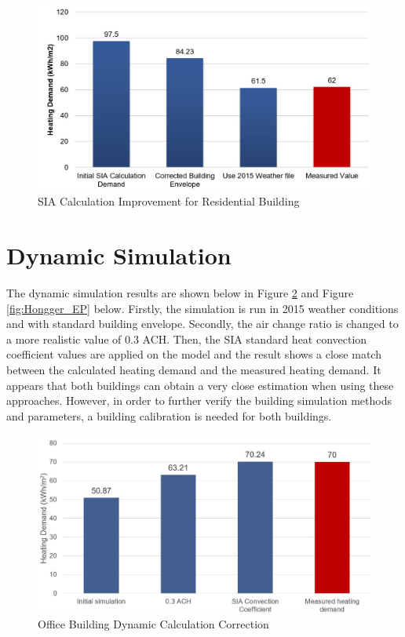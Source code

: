 \documentclass[a4paper, oneside]{discothesis}
\begin{document}
		\begin{figure}[htbp]
		\centering
		\includegraphics[scale=0.4]{Residential_SIA.jpg}
		\caption{SIA Calculation Improvement for Residential Building}
		\label{fig:Hongger_SIA}
		\end{figure}
		
		
	\newpage		  
	\section{Dynamic Simulation}		
			The dynamic simulation results are shown below in Figure \ref{fig:Sumatra_EP} and Figure \ref{fig:Hongger_EP} below. Firstly, the simulation is run in 2015 weather conditions and with standard building envelope. Secondly, the air change ratio is changed to a more realistic value of 0.3 ACH. Then, the SIA standard heat convection coefficient values are applied on the model and the result shows a close match between the calculated heating demand and the measured heating demand. It appears that both buildings can obtain a very close estimation when using these approaches. However, in order to further verify the building simulation methods and parameters, a building calibration is needed for both buildings.
		

		\begin{figure}[htbp]
		\centering
		\includegraphics[scale=0.5]{Office_EP.jpg}
		\caption{Office Building Dynamic Calculation Correction}
		\label{fig:Sumatra_EP}
		\end{figure}
\end{document}
